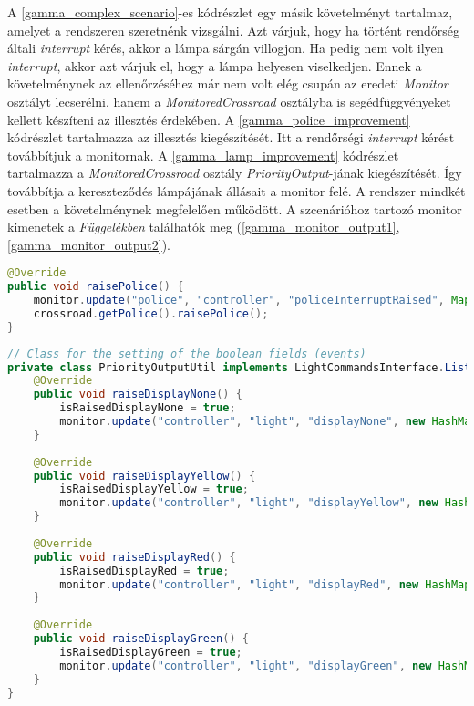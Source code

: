 A \ref{gamma_complex_scenario}-es kódrészlet egy másik követelményt tartalmaz, amelyet a rendszeren szeretnénk vizsgálni.
Azt várjuk, hogy ha történt rendőrség általi \textit{interrupt} kérés, akkor a lámpa sárgán villogjon.
Ha pedig nem volt ilyen \textit{interrupt}, akkor azt várjuk el, hogy a lámpa helyesen viselkedjen.
Ennek a követelménynek az ellenőrzéséhez már nem volt elég csupán az eredeti \textit{Monitor} osztályt lecserélni, hanem a \textit{MonitoredCrossroad} osztályba is segédfüggvényeket kellett készíteni az illesztés érdekében.
A \ref{gamma_police_improvement} kódrészlet tartalmazza az illesztés kiegészítését.
Itt a rendőrségi \textit{interrupt} kérést továbbítjuk a monitornak.
A \ref{gamma_lamp_improvement} kódrészlet tartalmazza a \textit{MonitoredCrossroad} osztály \textit{PriorityOutput}-jának kiegészítését.
Így továbbítja a kereszteződés lámpájának állásait a monitor felé.
A rendszer mindkét esetben a követelménynek megfelelően működött.
A szcenárióhoz tartozó monitor kimenetek a \textit{Függelékben} találhatók meg (\ref{gamma_monitor_output1}, \ref{gamma_monitor_output2}).

\begin{lstlisting}[language=java, frame=single, float=ht!, caption={\textit{Gamma} illesztéshez tartozó kódrészlet.},captionpos=b,label=gamma_police_improvement]
@Override
public void raisePolice() {
    monitor.update("police", "controller", "policeInterruptRaised", Map.of("success", true));
    crossroad.getPolice().raisePolice();
}
\end{lstlisting}

\begin{lstlisting}[language=java, frame=single, float=ht!, caption={\textit{MonitoredCrossroad} osztály kiegészítése a monitor illesztésével.},captionpos=b,label=gamma_lamp_improvement]
// Class for the setting of the boolean fields (events)
private class PriorityOutputUtil implements LightCommandsInterface.Listener.Provided {
    @Override
    public void raiseDisplayNone() {
        isRaisedDisplayNone = true;
        monitor.update("controller", "light", "displayNone", new HashMap<String, Object>());
    }
    
    @Override
    public void raiseDisplayYellow() {
        isRaisedDisplayYellow = true;
        monitor.update("controller", "light", "displayYellow", new HashMap<String, Object>());
    }
    
    @Override
    public void raiseDisplayRed() {
        isRaisedDisplayRed = true;
        monitor.update("controller", "light", "displayRed", new HashMap<String, Object>());
    }
    
    @Override
    public void raiseDisplayGreen() {
        isRaisedDisplayGreen = true;
        monitor.update("controller", "light", "displayGreen", new HashMap<String, Object>());
    }
}
\end{lstlisting}